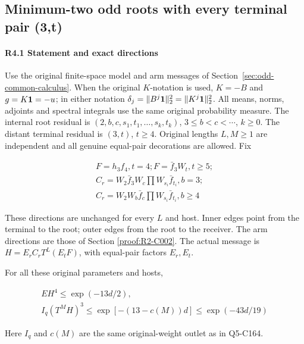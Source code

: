 \subsection{Minimum-two odd roots with every terminal pair (3,t)}\label{proof:R2-C004}
\paragraph{R4.1 Statement and exact directions}

Use the original finite-space model and arm messages of
Section~\ref{sec:odd-common-calculus}.
When the original \(K\)-notation is used, \(K=-B\) and
\(g=K\mathbf1=-u\); in either notation
\(\delta_j=\|B^j\mathbf1\|_2^2=\|K^j\mathbf1\|_2^2\).
All means, norms, adjoints and spectral integrals use the same
original probability measure.
The internal root residual is \((2,\allowbreak \allowbreak  b,\allowbreak \allowbreak  c,\allowbreak \allowbreak  s_1,\allowbreak \allowbreak  t_1,\allowbreak \allowbreak  \ldots,\allowbreak \allowbreak  s_k,\allowbreak \allowbreak  t_k)\), \(3\le b<c<\cdots\), \(k\ge0\). The distant terminal residual is \((3,\allowbreak \allowbreak  t)\), \(t\ge4\). Original lengths \(L,\allowbreak \allowbreak  M\ge1\) are independent and all genuine equal-pair decorations are allowed. Fix

\[
\begin{gathered}
F=h_3 f_4,t=4;F=\bar f_3 W_t,t\ge 5;\\
C_r=W_2 \bar f_3 W_c \prod W_{s_i}\bar f_{t_i},b=3;\\
C_r=W_2 W_b \bar f_c \prod W_{s_i}\bar f_{t_i},b\ge 4
\end{gathered}
\]

These directions are unchanged for every \(L\) and host. Inner edges point from the terminal to the root; outer edges from the root to the receiver. The arm directions are those of Section \ref{proof:R2-C002}. The actual message is \(H=E_rC_rT^L(E_tF)\), with equal-pair factors \(E_r,\allowbreak \allowbreak  E_t\).

For all these original parameters and hosts,

\[
\begin{gathered}
EH^4\le \exp(-13d/2),\\
I_q(T^M H)^3\le \exp[-(13-c(M))d]\le \exp(-43d/19) 
\end{gathered}\tag{R4.1.1}
\]

Here \(I_q\) and \(c(M)\) are the same original-weight outlet as in Q5-C164.


